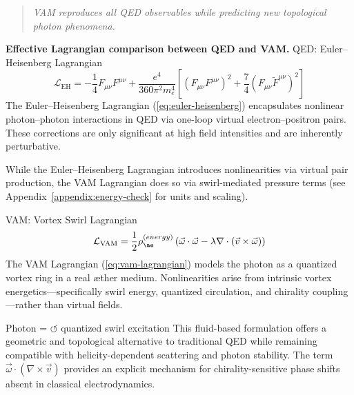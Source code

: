\begin{quote}
        \emph{VAM reproduces all QED observables while predicting new topological photon phenomena.}
\end{quote}


\textbf{Effective Lagrangian comparison between QED and VAM.}
QED: Euler–Heisenberg Lagrangian
\[\mathcal{L}_{\mathrm{EH}} = -\frac{1}{4}F_{\mu\nu}F^{\mu\nu} + \frac{e^4}{360\pi^2 m_e^4}\left[(F_{\mu\nu}F^{\mu\nu})^2 + \frac{7}{4}(F_{\mu\nu}\tilde{F}^{\mu\nu})^2\right]\]
The Euler–Heisenberg Lagrangian (\ref{eq:euler-heisenberg}) encapsulates nonlinear photon–photon interactions in QED via one-loop virtual electron–positron pairs. These corrections are only significant at high field intensities and are inherently perturbative.

While the Euler–Heisenberg Lagrangian introduces nonlinearities via virtual pair production, the VAM Lagrangian does so via swirl-mediated pressure terms (see Appendix~\ref{appendix:energy-check} for units and scaling).



VAM: Vortex Swirl Lagrangian
\[\mathcal{L}_{\mathrm{VAM}} = \frac{1}{2} \rho_{\ae}^{(energy)} \left( \vec{\omega} \cdot \vec{\omega} - \lambda \nabla \cdot (\vec{v} \times \vec{\omega}) \right)\]
The VAM Lagrangian (\ref{eq:vam-lagrangian}) models the photon as a quantized vortex ring in a real æther medium. Nonlinearities arise from intrinsic vortex energetics—specifically swirl energy, quantized circulation, and chirality coupling—rather than virtual fields.

Photon = $\circlearrowleft$ quantized swirl excitation
This fluid-based formulation offers a geometric and topological alternative to traditional QED while remaining compatible with helicity-dependent scattering and photon stability. The term \( \vec{\omega} \cdot (\nabla \times \vec{v}) \) provides an explicit mechanism for chirality-sensitive phase shifts absent in classical electrodynamics.

